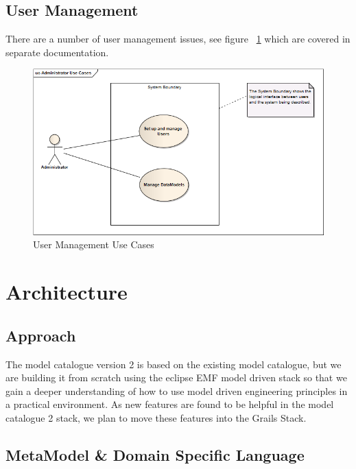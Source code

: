 \documentclass{article}
\begin{document}
\subsection{User Management}

There are a number of user management issues, see figure ~\ref{fig:adminUC} which are covered in separate documentation. 

\begin{figure}[here]
	\includegraphics[scale=0.4]{diagrams/adminusecase}
	\caption{User Management Use Cases} 
	\label{fig:adminUC}
\end{figure}



 




\section{Architecture}

\subsection{Approach}

The model catalogue version 2 is based on the existing model catalogue, but we are building it from scratch using the eclipse EMF model driven stack so that we gain a deeper understanding of how to use model driven engineering principles in a practical environment. As new features are found to be helpful in the model catalogue 2 stack, we plan to move these features into the Grails Stack.

\subsection{MetaModel \& Domain Specific Language}
\end{document}
